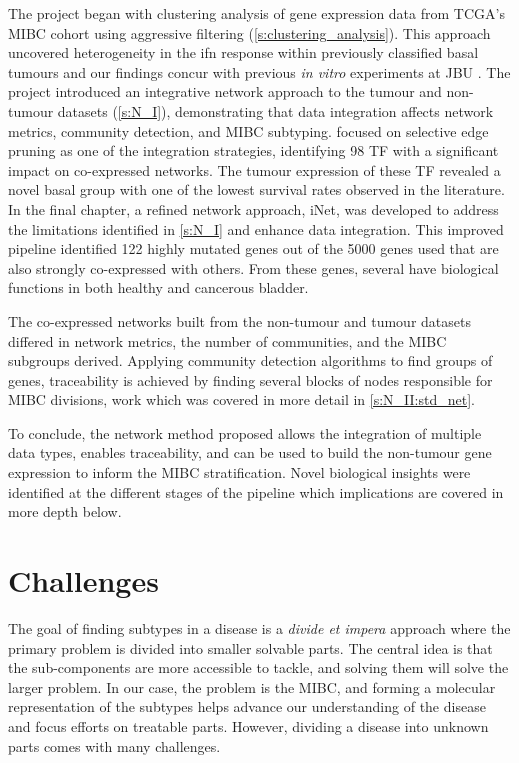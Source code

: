 The project began with clustering analysis of gene expression data from TCGA's MIBC cohort using aggressive filtering (\cref{s:clustering_analysis}). This approach uncovered heterogeneity in the \acrlong{ifn} response within previously classified basal tumours \citep{Robertson2017-mg, Kamoun2020-tj} and our findings concur with previous \textit{in vitro} experiments at JBU \citep{Baker2022-bj}. The project introduced an integrative network approach to the tumour and non-tumour datasets (\cref{s:N_I}), demonstrating that data integration affects network metrics, community detection, and MIBC subtyping.  focused on selective edge pruning as one of the integration strategies, identifying 98 TF with a significant impact on co-expressed networks. The tumour expression of these TF revealed a novel basal group with one of the lowest survival rates observed in the literature. In the final chapter, a refined network approach, iNet, was developed to address the limitations identified in \cref{s:N_I} and enhance data integration. This improved pipeline identified 122 highly mutated genes out of the 5000 genes used that are also strongly co-expressed with others. From these genes, several have biological functions in both healthy and cancerous bladder.

The co-expressed networks built from the non-tumour and tumour datasets differed in network metrics, the number of communities, and the MIBC subgroups derived. Applying community detection algorithms to find groups of genes, traceability is achieved by finding several blocks of nodes responsible for MIBC divisions, work which was covered in more detail in \cref{s:N_II:std_net}.

% 
To conclude, the network method proposed allows the integration of multiple data types, enables traceability, and can be used to build the non-tumour gene expression to inform the MIBC stratification. Novel biological insights were identified at the different stages of the pipeline which implications are covered in more depth below.

\section{Challenges}

The goal of finding subtypes in a disease is a \textit{divide et impera} approach where the primary problem is divided into smaller solvable parts. The central idea is that the sub-components are more accessible to tackle, and solving them will solve the larger problem. In our case, the problem is the MIBC, and forming a molecular representation of the subtypes helps advance our understanding of the disease and focus efforts on treatable parts. However, dividing a disease into unknown parts comes with many challenges. 

